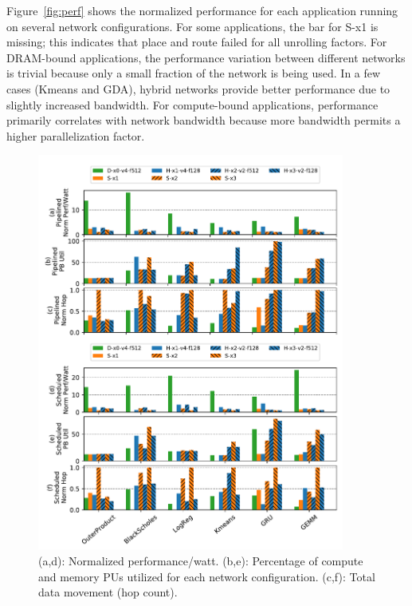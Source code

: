 Figure~\ref{fig:perf} shows the normalized performance for each application running on several network configurations.
For some applications, the bar for S-x1 is missing; this indicates that place and route failed for all unrolling factors.
For DRAM-bound applications, the performance variation between different networks is trivial because only a small fraction of the network is being used. 
In a few cases (Kmeans and GDA), hybrid networks provide better performance due to slightly increased bandwidth.
For compute-bound applications, performance primarily correlates with network bandwidth because more bandwidth permits a higher parallelization factor. 

\begin{figure}
\centering
  \includegraphics[width=0.9\textwidth]{network/figs/energy.pdf} 
  \caption[Performance/watt, PU utilization, and data movement for netork configurations]{(a,d): Normalized performance/watt. (b,e): Percentage of compute and memory PUs utilized for each network configuration. 
  (c,f): Total data movement (hop count).}
\label{fig:energy}
\end{figure}

